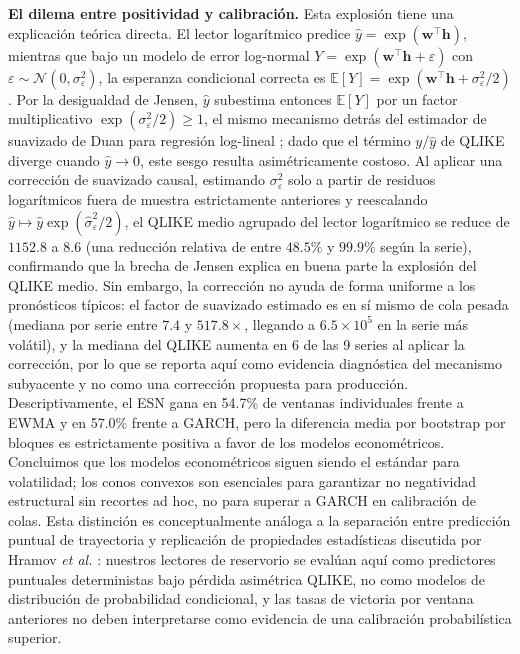 \documentclass[aip,cha,reprint,amsmath,amssymb]{revtex4-2}
\begin{document}
\textbf{El dilema entre positividad y calibración.} Esta explosión tiene una explicación teórica directa. El lector logarítmico predice $\hat{y} = \exp(\mathbf{w}^\top\mathbf{h})$, mientras que bajo un modelo de error log-normal $Y = \exp(\mathbf{w}^\top\mathbf{h} + \varepsilon)$ con $\varepsilon \sim \mathcal{N}(0,\sigma_\varepsilon^2)$, la esperanza condicional correcta es $\mathbb{E}[Y] = \exp(\mathbf{w}^\top\mathbf{h} + \sigma_\varepsilon^2/2)$. Por la desigualdad de Jensen, $\hat{y}$ subestima entonces $\mathbb{E}[Y]$ por un factor multiplicativo $\exp(\sigma_\varepsilon^2/2) \ge 1$, el mismo mecanismo detrás del estimador de suavizado de Duan para regresión log-lineal \cite{duan1983smearing}; dado que el término $y/\hat{y}$ de QLIKE diverge cuando $\hat{y}\to 0$, este sesgo resulta asimétricamente costoso. Al aplicar una corrección de suavizado causal, estimando $\sigma_\varepsilon^2$ solo a partir de residuos logarítmicos fuera de muestra estrictamente anteriores y reescalando $\hat{y} \mapsto \hat{y}\exp(\hat\sigma_\varepsilon^2/2)$, el QLIKE medio agrupado del lector logarítmico se reduce de $1152.8$ a $8.6$ (una reducción relativa de entre $48.5\%$ y $99.9\%$ según la serie), confirmando que la brecha de Jensen explica en buena parte la explosión del QLIKE medio. Sin embargo, la corrección no ayuda de forma uniforme a los pronósticos típicos: el factor de suavizado estimado es en sí mismo de cola pesada (mediana por serie entre $7.4$ y $517.8\times$, llegando a $6.5\times10^5$ en la serie más volátil), y la mediana del QLIKE aumenta en 6 de las 9 series al aplicar la corrección, por lo que se reporta aquí como evidencia diagnóstica del mecanismo subyacente y no como una corrección propuesta para producción. Descriptivamente, el ESN gana en 54.7\% de ventanas individuales frente a EWMA y en 57.0\% frente a GARCH, pero la diferencia media por bootstrap por bloques es estrictamente positiva a favor de los modelos econométricos. Concluimos que los modelos econométricos siguen siendo el estándar para volatilidad; los conos convexos son esenciales para garantizar no negatividad estructural sin recortes ad hoc, no para superar a GARCH en calibración de colas. Esta distinción es conceptualmente análoga a la separación entre predicción puntual de trayectoria y replicación de propiedades estadísticas discutida por Hramov \emph{et al.} \cite{hramov2025strong}: nuestros lectores de reservorio se evalúan aquí como predictores puntuales deterministas bajo pérdida asimétrica QLIKE, no como modelos de distribución de probabilidad condicional, y las tasas de victoria por ventana anteriores no deben interpretarse como evidencia de una calibración probabilística superior.
\end{document}
